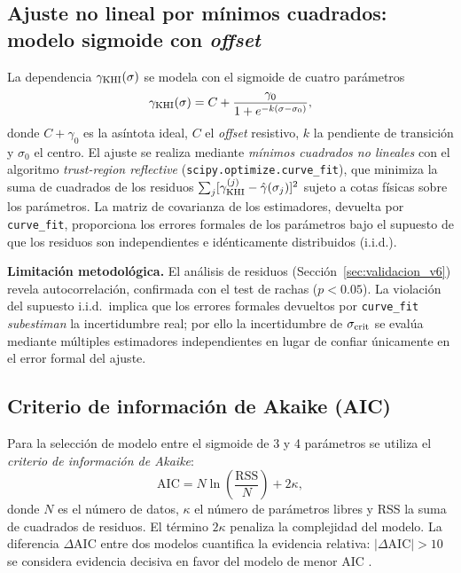 \subsection{Ajuste no lineal por mínimos cuadrados: modelo sigmoide con \emph{offset}}
\label{ap:est:nls}

\primerparrafo La dependencia $\gamma_{\mathrm{KHI}}(\sigma)$ se modela con el sigmoide de cuatro parámetros
\begin{equation}
    \gamma_{\mathrm{KHI}}(\sigma) = C + \frac{\gamma_0}{1 + e^{-k(\sigma - \sigma_0)}},
    \label{ap:eq:sigmoide}
\end{equation}
donde $C+\gamma_0$ es la asíntota ideal, $C$ el \emph{offset} resistivo, $k$ la pendiente de transición y $\sigma_0$ el centro. El ajuste se realiza mediante \emph{mínimos cuadrados no lineales} con el algoritmo \emph{trust-region reflective} (\texttt{scipy.optimize.curve\_fit}), que minimiza la suma de cuadrados de los residuos $\sum_j[\gamma_{\mathrm{KHI}}^{(j)}-\hat\gamma(\sigma_j)]^2$ sujeto a cotas físicas sobre los parámetros. La matriz de covarianza de los estimadores, devuelta por \texttt{curve\_fit}, proporciona los errores formales de los parámetros bajo el supuesto de que los residuos son independientes e idénticamente distribuidos (i.i.d.).

\primerparrafo \textbf{Limitación metodológica.} El análisis de residuos (Sección~\ref{sec:validacion_v6}) revela autocorrelación, confirmada con el test de rachas ($p<0.05$). La violación del supuesto i.i.d.\ implica que los errores formales devueltos por \texttt{curve\_fit} \emph{subestiman} la incertidumbre real; por ello la incertidumbre de $\sigma_{\mathrm{crit}}$ se evalúa mediante múltiples estimadores independientes en lugar de confiar únicamente en el error formal del ajuste.

\subsection{Criterio de información de Akaike (AIC)}
\label{ap:est:aic}

\primerparrafo Para la selección de modelo entre el sigmoide de 3 y 4 parámetros se utiliza el \emph{criterio de información de Akaike}:
\begin{equation}
    \mathrm{AIC} = N\ln\!\left(\frac{\mathrm{RSS}}{N}\right) + 2\kappa,
\end{equation}
donde $N$ es el número de datos, $\kappa$ el número de parámetros libres y RSS la suma de cuadrados de residuos. El término $2\kappa$ penaliza la complejidad del modelo. La diferencia $\Delta\mathrm{AIC}$ entre dos modelos cuantifica la evidencia relativa: $|\Delta\mathrm{AIC}|>10$ se considera evidencia decisiva en favor del modelo de menor AIC \parencite{burnham-anderson-2002}.

